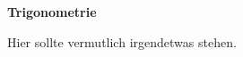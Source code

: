 \documentclass[11pt]{exam}
\newcommand{\theme}{Trigonometrie}
\begin{document}
\fontsize{14}{14}\selectfont
\begin{center}
    \huge\bf\theme
\end{center}

\begin{questions}
\question[2]
Hier sollte vermutlich irgendetwas stehen.

\end{questions}
\end{document}

